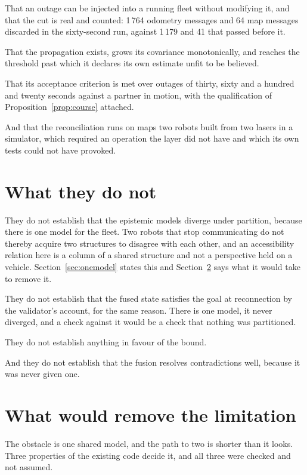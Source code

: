 \documentclass[11pt,a4paper]{article}
\theoremstyle{definition}
\begin{document}
That an outage can be injected into a running fleet without modifying it, and
that the cut is real and counted: 1\,764 odometry messages and 64 map messages
discarded in the sixty-second run, against 1\,179 and 41 that passed before it.

That the propagation exists, grows its covariance monotonically, and reaches
the threshold past which it declares its own estimate unfit to be believed.

That its acceptance criterion is met over outages of thirty, sixty and a
hundred and twenty seconds against a partner in motion, with the qualification
of Proposition~\ref{prop:course} attached.

And that the reconciliation runs on maps two robots built from two lasers in a
simulator, which required an operation the layer did not have and which its own
tests could not have provoked.

\section{What they do not}
\label{sec:notestablished}

They do not establish that the epistemic models diverge under partition,
because there is one model for the fleet. Two robots that stop communicating do
not thereby acquire two structures to disagree with each other, and an
accessibility relation here is a column of a shared structure and not a
perspective held on a vehicle. Section~\ref{sec:onemodel} states this and
Section~\ref{sec:next} says what it would take to remove it.

They do not establish that the fused state satisfies the goal at reconnection
by the validator's account, for the same reason. There is one model, it never
diverged, and a check against it would be a check that nothing was partitioned.

They do not establish anything in favour of the bound.

And they do not establish that the fusion resolves contradictions well, because
it was never given one.

\section{What would remove the limitation}
\label{sec:next}

The obstacle is one shared model, and the path to two is shorter than it looks.
Three properties of the existing code decide it, and all three were checked
and not assumed.
\end{document}
